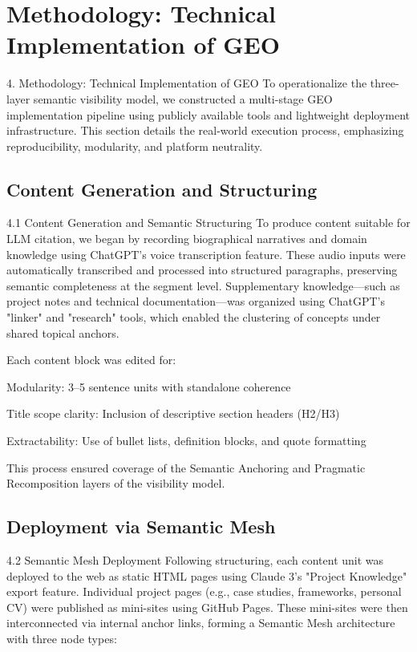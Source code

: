 \section{Methodology: Technical Implementation of GEO}

4. Methodology: Technical Implementation of GEO
To operationalize the three-layer semantic visibility model, we constructed a multi-stage GEO implementation pipeline using publicly available tools and lightweight deployment infrastructure. This section details the real-world execution process, emphasizing reproducibility, modularity, and platform neutrality.
\subsection{Content Generation and Structuring}

4.1 Content Generation and Semantic Structuring
To produce content suitable for LLM citation, we began by recording biographical narratives and domain knowledge using ChatGPT’s voice transcription feature. These audio inputs were automatically transcribed and processed into structured paragraphs, preserving semantic completeness at the segment level. Supplementary knowledge—such as project notes and technical documentation—was organized using ChatGPT’s "linker" and "research" tools, which enabled the clustering of concepts under shared topical anchors.

Each content block was edited for:

Modularity: 3–5 sentence units with standalone coherence

Title scope clarity: Inclusion of descriptive section headers (H2/H3)

Extractability: Use of bullet lists, definition blocks, and quote formatting

This process ensured coverage of the Semantic Anchoring and Pragmatic Recomposition layers of the visibility model.

\subsection{Deployment via Semantic Mesh}

4.2 Semantic Mesh Deployment
Following structuring, each content unit was deployed to the web as static HTML pages using Claude 3's "Project Knowledge" export feature. Individual project pages (e.g., case studies, frameworks, personal CV) were published as mini-sites using GitHub Pages. These mini-sites were then interconnected via internal anchor links, forming a Semantic Mesh architecture with three node types:

